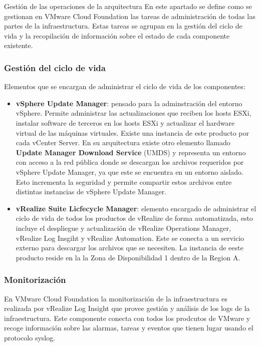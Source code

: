 \begin{subsection}{Gestión de las operaciones de la arquitectura}
En este apartado se define como se gestionan en VMware Cloud Foundation las tareas de administración de todas las partes de la infraestructura. Estas tareas se agrupan en la gestión del ciclo de vida y la recopilación de información sobre el estado de cada componente existente.

\subsubsection{Gestión del ciclo de vida}
Elementos que se encargan de administrar el ciclo de vida de los componentes:
\begin{itemize}
    \item \textbf{vSphere Update Manager}: pensado para la adminstración del entorno vSphere. Permite administrar las actualizaciones que reciben los hosts ESXi, instalar software de terceros en los hosts ESXi y actualizar el hardware virtual de las máquinas virtuales. Existe una instancia de este producto por cada vCenter Server. En su arquitectura existe otro elemento llamado \textbf{Update Manager Download Service} (UMDS) y representa un entorno con acceso a la red pública donde se descargan los archivos requeridos por vSphere Update Manager, ya que este se encuentra en un entorno aislado. Esto incrementa la seguridad y permite compartir estos archivos entre distintas instancias de vSphere Update Manager.
    
    \item \textbf{vRealize Suite Licfecycle Manager}: elemento encargado de administrar el ciclo de vida de todos los productos de vRealize de forma automatizada, esto incluye el despliegue y actualización de vRealize Operations Manager, vRealize Log Insgiht y vRealize Automation. Este se conecta a un servicio externo para descargar los archivos que se necesiten. La instancia de eeste producto reside en la la Zona de Disponibilidad 1 dentro de la Region A.
    
\end{itemize}

\subsubsection{Monitorización}
En VMware Cloud Foundation la monitorización de la infraestructura es realizada por vRealize Log Insight que provee gestión y análisis de los logs de la infraestructura. Este componente conecta con todos los prodcutos de VMware y recoge información sobre las alarmas, tareas y eventos que tienen lugar usando el protocolo syslog.\\


\end{subsection}
